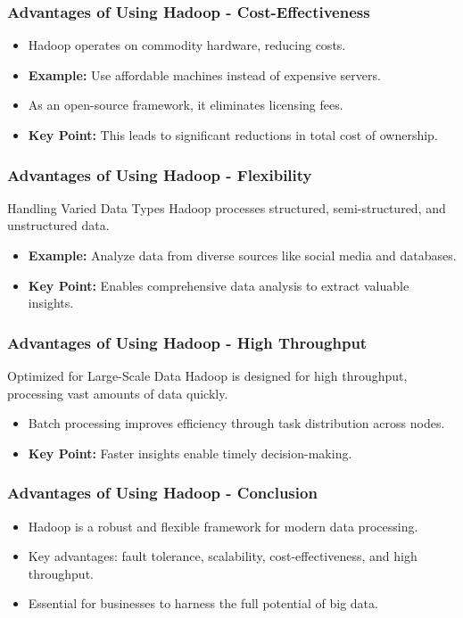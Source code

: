 \documentclass[aspectratio=169]{beamer}
\begin{document}
\begin{frame}[fragile]
    \frametitle{Advantages of Using Hadoop - Cost-Effectiveness}
    \begin{itemize}
        \item Hadoop operates on commodity hardware, reducing costs.
        \item \textbf{Example:} Use affordable machines instead of expensive servers.
        \item As an open-source framework, it eliminates licensing fees.
        \item \textbf{Key Point:} This leads to significant reductions in total cost of ownership.
    \end{itemize}
\end{frame}

\begin{frame}[fragile]
    \frametitle{Advantages of Using Hadoop - Flexibility}
    \begin{block}{Handling Varied Data Types}
        Hadoop processes structured, semi-structured, and unstructured data.
    \end{block}
    \begin{itemize}
        \item \textbf{Example:} Analyze data from diverse sources like social media and databases.
        \item \textbf{Key Point:} Enables comprehensive data analysis to extract valuable insights.
    \end{itemize}
\end{frame}

\begin{frame}[fragile]
    \frametitle{Advantages of Using Hadoop - High Throughput}
    \begin{block}{Optimized for Large-Scale Data}
        Hadoop is designed for high throughput, processing vast amounts of data quickly.
    \end{block}
    \begin{itemize}
        \item Batch processing improves efficiency through task distribution across nodes.
        \item \textbf{Key Point:} Faster insights enable timely decision-making.
    \end{itemize}
\end{frame}

\begin{frame}[fragile]
    \frametitle{Advantages of Using Hadoop - Conclusion}
    \begin{itemize}
        \item Hadoop is a robust and flexible framework for modern data processing.
        \item Key advantages: fault tolerance, scalability, cost-effectiveness, and high throughput.
        \item Essential for businesses to harness the full potential of big data.
    \end{itemize}
\end{frame}
\end{document}
